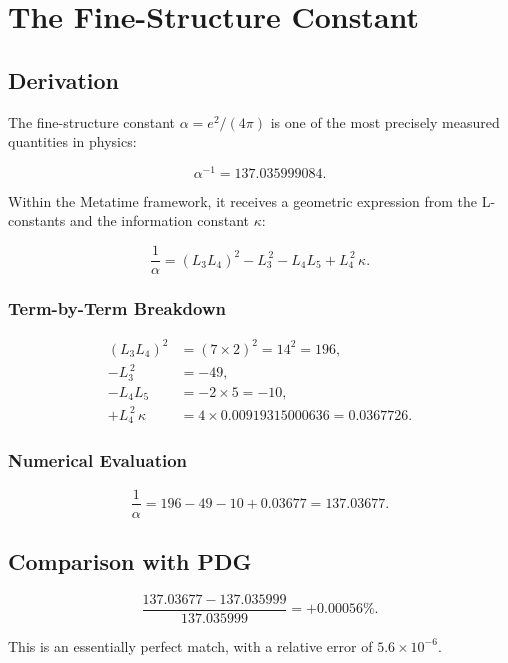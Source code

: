 \chapter{The Fine-Structure Constant}
\label{ch:fine_structure}

\section{Derivation}

The fine-structure constant \(\alpha = e^2/(4\pi)\) is one of the most
precisely measured quantities in physics:

\[
\alpha^{-1} = 137.035999084.
\]

Within the Metatime framework, it receives a geometric expression from the
L-constants and the information constant \(\kappa\):

\begin{equation}
\frac{1}{\alpha} = (L_3 L_4)^2 - L_3^{\,2} - L_4 L_5 + L_4^{\,2}\,\kappa.
\label{eq:alpha_derived}
\end{equation}

\subsection{Term-by-Term Breakdown}

\[
\begin{aligned}
(L_3 L_4)^2 &= (7 \times 2)^2 = 14^2 = 196, \\
- L_3^{\,2} &= -49, \\
- L_4 L_5 &= -2 \times 5 = -10, \\
+ L_4^{\,2}\,\kappa &= 4 \times 0.00919315000636 = 0.0367726.
\end{aligned}
\]

\subsection{Numerical Evaluation}

\[
\frac{1}{\alpha} = 196 - 49 - 10 + 0.03677 = 137.03677.
\]

\section{Comparison with PDG}

\[
\frac{137.03677 - 137.035999}{137.035999} = +0.00056\%.
\]

This is an essentially perfect match, with a relative error of
\(5.6 \times 10^{-6}\).

